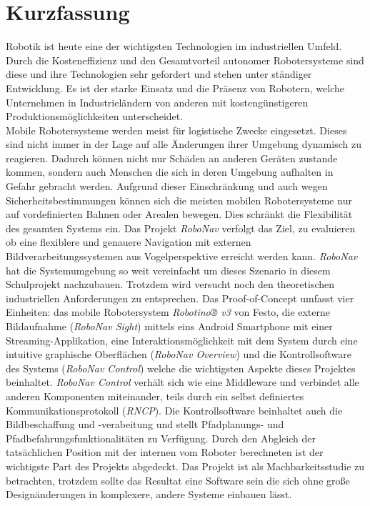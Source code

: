 \section*{Kurzfassung}

Robotik ist heute eine der wichtigsten Technologien im industriellen Umfeld. Durch die Kosteneffizienz und den Gesamtvorteil autonomer Robotersysteme sind diese und ihre Technologien sehr gefordert und stehen unter ständiger Entwicklung. Es ist der starke Einsatz und die Präsenz von Robotern, welche Unternehmen in Industrieländern von anderen mit kostengünstigeren Produktionsmöglichkeiten unterscheidet.\\
Mobile Robotersysteme werden meist für logistische Zwecke eingesetzt.
Dieses sind nicht immer in der Lage auf alle Änderungen ihrer Umgebung dynamisch zu reagieren. Dadurch können nicht nur Schäden an anderen Geräten zustande kommen, sondern auch Menschen die sich in deren Umgebung aufhalten in Gefahr gebracht werden.
Aufgrund dieser Einschränkung und auch wegen Sicherheitsbestimmungen können sich die meisten mobilen Robotersysteme nur auf vordefinierten Bahnen oder Arealen bewegen. Dies schränkt die Flexibilität des gesamten Systems ein.
Das Projekt \textit{RoboNav} verfolgt das Ziel, zu evaluieren ob eine flexiblere und genauere Navigation mit externen Bildverarbeitungssystemen aus Vogelperspektive erreicht werden kann.
\textit{RoboNav} hat die Systemumgebung so weit vereinfacht um dieses Szenario in diesem Schulprojekt nachzubauen. Trotzdem wird versucht noch den theoretischen industriellen Anforderungen zu entsprechen.
Das Proof-of-Concept umfasst vier Einheiten: das mobile Robotersystem \textit{ Robotino® v3} von Festo, die externe Bildaufnahme (\textit{RoboNav Sight}) mittels eins Android Smartphone mit einer Streaming-Applikation, eine Interaktionsmöglichkeit mit dem System durch eine intuitive graphische Oberflächen (\textit{RoboNav Overview}) und die Kontrollsoftware des Systems (\textit{RoboNav Control})  welche die wichtigsten Aspekte dieses Projektes beinhaltet. \textit{RoboNav Control} verhält sich wie eine Middleware und verbindet alle anderen Komponenten miteinander, teils durch ein selbst definiertes Kommunikationsprotokoll (\textit{RNCP}). Die Kontrollsoftware beinhaltet auch die Bildbeschaffung und -verabeitung und stellt Pfadplanungs- und Pfadbefahrungsfunktionalitäten zu Verfügung. Durch den Abgleich der tatsächlichen Position mit der internen vom Roboter berechneten ist der wichtigste Part des Projekts abgedeckt.
Das Projekt ist als Machbarkeitsstudie zu betrachten, trotzdem sollte das Resultat eine Software sein die sich ohne große Designänderungen in komplexere, andere Systeme einbauen lässt.
